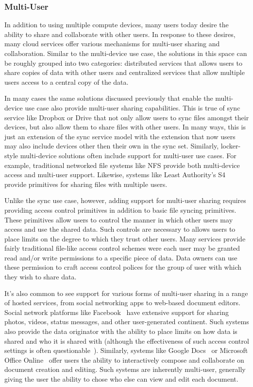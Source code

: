 \subsubsection{Multi-User}

In addition to using multiple compute devices, many users today desire
the ability to share and collaborate with other users. In response to
these desires, many cloud services offer various mechanisms for
multi-user sharing and collaboration. Similar to the multi-device use
case, the solutions in this space can be roughly grouped into two
categories: distributed services that allows users to share copies of
data with other users and centralized services that allow multiple
users access to a central copy of the data.

In many cases the same solutions discussed previously that enable the
multi-device use case also provide multi-user sharing
capabilities. This is true of sync service like Dropbox or Drive that
not only allow users to sync files amongst their devices, but also
allow them to share files with other users. In many ways, this is just
an extension of the sync service model with the extension that now
users may also include devices other then their own in the sync
set. Similarly, locker-style multi-device solutions often
include support for multi-user use cases. For example, traditional
networked file systems like NFS provide both multi-device access and
multi-user support. Likewise, systems like Least Authority's S4
provide primitives for sharing files with multiple users.

Unlike the sync use case, however, adding support for multi-user
sharing requires providing access control primitives in addition to
basic file syncing primitives. These primitives allow users to control
the manner in which other users may access and use the shared
data. Such controls are necessary to allows users to place limits on
the degree to which they trust other users. Many services provide
fairly traditional file-like access control schemes were each user may
be granted read and/or write permissions to a specific piece of
data. Data owners can use these permission to craft access control
polices for the group of user with which they wish to share data.

It's also common to see support for various forms of multi-user
sharing in a range of hosted services, from social networking apps to
web-based document editors. Social network platforms like
Facebook~\cite{facebook} have extensive support for sharing photos,
videos, status messages, and other user-generated continent. Such
systems also provide the data originator with the ability to place
limits on how data is shared and who it is shared with (although the
effectiveness of such access control settings is often
questionable~\cite{johnson2012}). Similarly, systems like Google
Docs~\cite{google-docs} or Microsoft Office
Online~\cite{microsoft-officeonline} offer users the ability to
interactively compose and collaborate on document creation and
editing. Such systems are inherently multi-user, generally giving the
user the ability to chose who else can view and edit each document.

